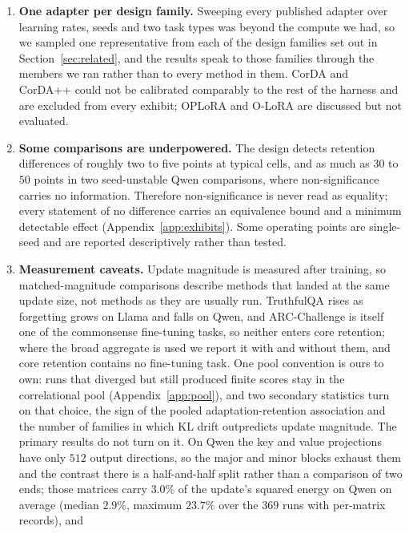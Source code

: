 \documentclass[11pt]{article}
\begin{document}
\begin{enumerate}
  \item \textbf{One adapter per design family.} Sweeping every published
        adapter over learning rates, seeds and two task types was beyond the
        compute we had, so we sampled one representative from each of the
        design families set out in Section~\ref{sec:related}, and the results
        speak to those families through the members we ran rather than to
        every method in them. CorDA and CorDA++ could not be calibrated
        comparably to the rest of the harness and are excluded from every
        exhibit; OPLoRA and O-LoRA are discussed but not evaluated.
  \item \textbf{Some comparisons are underpowered.} The design detects
        retention differences of roughly two to five points at typical cells,
        and as much as $30$ to $50$ points in two seed-unstable Qwen
        comparisons, where non-significance carries no information. Therefore
        non-significance is never read
        as equality; every statement of no difference carries an equivalence
        bound and a minimum detectable effect (Appendix~\ref{app:exhibits}).
        Some operating points are single-seed and are reported descriptively
        rather than tested.
  \item \textbf{Measurement caveats.} Update magnitude is measured after
        training, so matched-magnitude comparisons describe methods that
        landed at the same update size, not methods as they are usually run.
        TruthfulQA rises as forgetting grows on Llama and falls on Qwen, and
        ARC-Challenge is itself one of the commonsense fine-tuning tasks, so
        neither enters core retention; where the broad aggregate is used we
        report it with and without them, and core
        retention contains no fine-tuning task. One pool convention is ours to
        own: runs that diverged but still produced finite scores stay in the
        correlational pool (Appendix~\ref{app:pool}), and two secondary
        statistics turn on that choice, the sign of the pooled
        adaptation-retention association and the number of families in which
        KL drift outpredicts update magnitude. The primary results do not turn
        on it. On Qwen the key and value
        projections have only $512$ output directions, so the major and minor
        blocks exhaust them and the contrast there is a half-and-half split
        rather than a comparison of two ends; those matrices carry $3.0\%$
        of the update's squared energy on Qwen on average (median $2.9\%$,
        maximum $23.7\%$ over the $369$ runs with per-matrix records), and

\end{enumerate}
\end{document}
